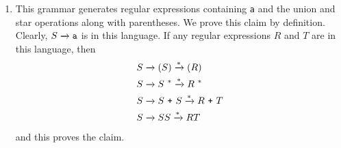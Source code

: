 \begin{solution}
\begin{enumerate}[label=\alph*)]
        \item This grammar generates regular expressions containing \texttt{a}
        and the union and star operations along with parentheses. We prove this 
        claim by definition. Clearly, $S \xrightarrow{} \texttt{a}$ is in this language. 
        If any regular expressions $R$ and $T$ are in this language, then
        \begin{align*}
            S &\xrightarrow{} \left( S \right) \xrightarrow{*} \left( R \right) \\
            S &\xrightarrow{} S^{\ *} \xrightarrow{*} R^{\ *} \\
            S &\xrightarrow{} S\ \texttt{+}\ S \xrightarrow{*} R\ \texttt{+}\ T \\
            S &\xrightarrow{} SS \xrightarrow{*} RT
        \end{align*}
        and this proves the claim.
    \end{enumerate}
\end{solution}